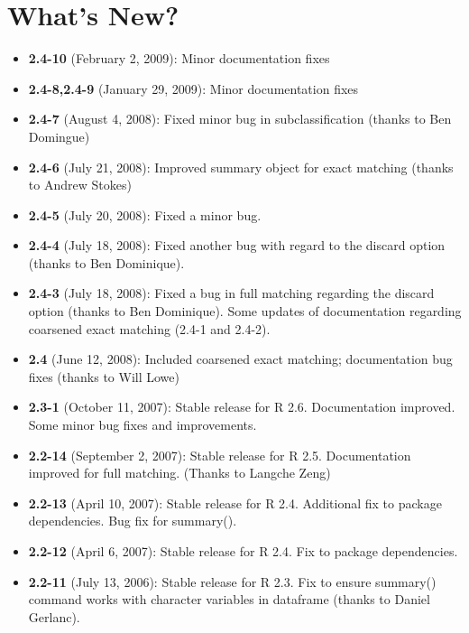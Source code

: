 \documentclass[oneside,letterpaper,12pt]{book}
\begin{document}









\chapter{What's New?}

\begin{itemize}
\item \textbf{2.4-10} (February 2, 2009): Minor documentation fixes
\item \textbf{2.4-8,2.4-9} (January 29, 2009): Minor documentation fixes
\item \textbf{2.4-7} (August 4, 2008): Fixed minor bug in subclassification 
(thanks to Ben Domingue)
\item \textbf{2.4-6} (July 21, 2008): Improved summary object for
  exact matching (thanks to Andrew Stokes)
\item \textbf{2.4-5} (July 20, 2008): Fixed a minor bug.
\item \textbf{2.4-4} (July 18, 2008): Fixed another bug with regard to the discard option (thanks to Ben Dominique).
\item \textbf{2.4-3} (July 18, 2008): Fixed a bug in full matching
  regarding the discard option (thanks to Ben Dominique). Some updates
  of documentation regarding coarsened exact matching (2.4-1 and
  2.4-2).
\item \textbf{2.4} (June 12, 2008): Included coarsened exact matching;
  documentation bug fixes (thanks to Will Lowe)
\item \textbf{2.3-1} (October 11, 2007): Stable release for R
  2.6. Documentation improved. Some minor bug fixes and improvements.
\item \textbf{2.2-14} (September 2, 2007): Stable release for R 2.5.
  Documentation improved for full matching. (Thanks to Langche Zeng)
\item \textbf{2.2-13} (April 10, 2007): Stable release for R
  2.4. Additional fix to package dependencies. Bug fix for summary().
\item \textbf{2.2-12} (April 6, 2007): Stable release for R 2.4. Fix
  to package dependencies.
\item \textbf{2.2-11} (July 13, 2006): Stable release for R 2.3.
  Fix to ensure summary() command works with character variables in dataframe (thanks to Daniel Gerlanc).

\end{itemize}
\end{document}
